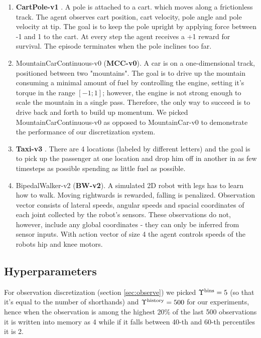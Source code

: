 \begin{enumerate}
\item \textbf{CartPole-v1} \cite{cartpole}.
A pole is attached to a cart.  which moves along a frictionless track.
The agent observes cart position, cart velocity, pole angle and pole velocity at tip.
The goal is to keep the pole upright by applying force between -1 and 1 to the cart.
At every step the agent receives a +1 reward for survival.
The episode terminates when the pole inclines too far.
\item MountainCarContinuous-v0 (\textbf{MCC-v0})\cite{mountain_car}.
A car is on a one-dimensional track, positioned between two "mountains". 
The goal is to drive up the mountain consuming a minimal amount of fuel by controlling the engine, setting it's torque in the range $[-1;1]$; however, the engine is not strong enough to scale the mountain in a single pass.
Therefore, the only way to succeed is to drive back and forth to build up momentum. 
We picked MountainCarContinuous-v0 as opposed to MountainCar-v0 to demonstrate the performance of our discretization system.
\item \textbf{Taxi-v3} \cite{taxi}. There are 4 locations (labeled by different letters) and the goal is to pick up the passenger at one location and drop him off in another in as few timesteps as possible spending as little fuel as possible.
\item BipedalWalker-v2 (\textbf{BW-v2}). A simulated 2D robot with legs has to learn how to walk. 
Moving rightwards is rewarded, falling is penalized.
Observation vector consists of lateral speeds, angular speeds and spacial coordinates of each joint collected by the robot's sensors.
These observations do not, however, include any global coordinates - they can only be inferred from sensor inputs.
With action vector of size 4 the agent controls speeds of the robots hip and knee motors.
\end{enumerate}

\subsection{Hyperparameters}

For observation discretization (section \ref{sec:observe}) we picked $\Upsilon^\text{bins}=5$ (so that it's equal to the number of shorthands) and $\Upsilon^\text{history}=500$ for our experiments, hence when the observation is among the highest 20\% of the last 500 observations it is written into memory as 4 while if it falls between 40-th and 60-th percentiles it is 2.

